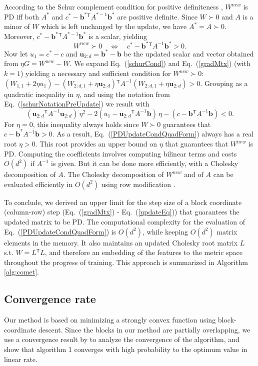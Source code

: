 \documentclass[twoside,11pt]{article}
\newcommand\mat[1]{{#1}}
\renewcommand\vec[1]{\mathbf{#1}}
\newcommand{\T}{{}^\mathsf{T}}
\newcommand{\W}{\mat{W}}
\newcommand{\newW}{{\mat{W^{new}}}}
\newcommand{\cholL}{\mat{L}}
\newcommand{\A}{\mat{A}}
\newcommand{\B}{\vec{b}}
\newcommand{\C}{c}
\newcommand{\invA}{A^{-1}}
\newcommand{\uscalar}{{u}_{1}}
\newcommand{\uvec}{\vec{u}_{2:d}}
\newcommand{\Wvec}{\W_{2:d,1}}
\newcommand{\Wscalar}{\W_{1,1}}
\renewcommand{\eqref}[1]{Eq.~(\ref{#1})}
\begin{document}
According to the Schur complement condition for positive definiteness
\citep[p. 650]{boyd2004convex}, $\newW$ is PD iff both
$A^*$ and $\C^* - \B^*\T A^{*-1} \B^*$ are positive definite.
Since $W \succ 0$ and $A$ is a minor of $\W$ which is left unchanged by the update, we have $A^* =
A \succ 0$. Moreover, $\C^* - \B^*\T A^{*-1} \B^*$ is a
scalar, yielding
\begin{equation}
  \newW \succ  0 \quad \Leftrightarrow \quad  \C^* - \B^*\T \invA \B^* >  0.
  \label{schurCond}
\end{equation}
Now let $\uscalar = \C^* - \C$ and $\uvec = \B^* - \B$ be the updated scalar and vector
obtained from $\eta G = \newW - \W$. We expand \eqref{schurCond} and
\eqref{gradMtx} (with $k=1$) yielding a necessary and sufficient condition for $\newW \succ 0$: $(\Wscalar + 2\eta \uscalar)-(\Wvec + \eta \uvec)\T \invA (\Wvec + \eta \uvec)   > 0$.
Grouping as a quadratic inequality in $\eta$, and using the notation from \eqref{schurNotationPreUpdate} we result with
\begin{equation}
\label{PDUpdateCondQuadForm}
(\uvec\T \invA \uvec) \, \eta^2 
-2(\uscalar - \uvec\T \invA \B) \,\eta 
-(\C - \B\T  \invA \B) < 0 .
\end{equation}
For $\eta = 0$, this inequality always
holds since $\W \succ 0$ guarantees that $\C-\B^{\T} \invA \B >0$. As a result,
 \eqref{PDUpdateCondQuadForm} always has a real
root $\eta > 0$. This root provides an upper bound on $\eta$ that guarantees that $\newW$ is PD. Computing the coefficients involves computing bilinear terms and costs $O(d^2)$ if $\invA$ is given. But it can be done more efficiently, with a Cholesky decomposition of $\A$. The Cholesky decomposition of $\newW$ and of $\A$ can be evaluated efficiently in $O(d^2)$ using row modification \citep{Davis05rowchol, CHOLMOD}.

To conclude, we derived an upper limit for the step size of a block coordinate (column-row) step (\eqref{gradMtx} - \eqref{updateEq}) that guarantees  the updated matrix to be PD. The computational complexity for the evaluation
of \eqref{PDUpdateCondQuadForm} is $O(d^2)$, while keeping $O(d^2)$ matrix elements in the memory.
It also maintains an updated Cholesky root matrix $\cholL$ s.t. $W = \cholL\T \cholL$, and therefore an embedding of the features to the metric space throughout the progress of training. This approach is summarized in Algorithm \ref{alg:comet}.


\subsection{Convergence rate}
Our method is based on minimizing a strongly convex function using block-coordinate descent. Since the blocks in our method are partially overlapping, we use a convergence result by \citet{richtarik2013optimal} to analyze the convergence of the algorithm, and show that algorithm 1 converges with high probability to the optimum value in linear rate.  
\end{document}
